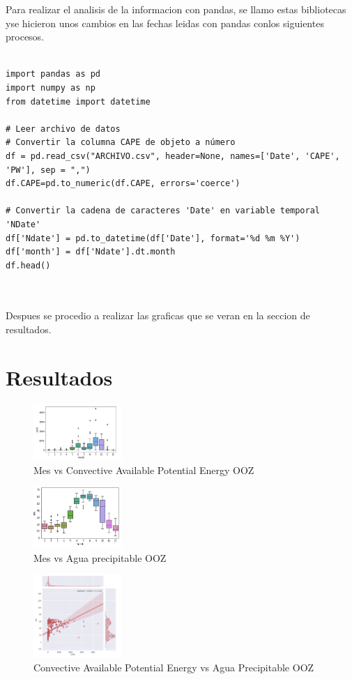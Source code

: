 \documentclass[a4paper]{article}
\begin{document}
Para realizar el analisis de la informacion con pandas, se llamo estas bibliotecas yse hicieron unos cambios en las fechas leidas con pandas conlos siguientes procesos. 

\begin{verbatim}

import pandas as pd
import numpy as np
from datetime import datetime

# Leer archivo de datos
# Convertir la columna CAPE de objeto a número
df = pd.read_csv("ARCHIVO.csv", header=None, names=['Date', 'CAPE', 'PW'], sep = ",")
df.CAPE=pd.to_numeric(df.CAPE, errors='coerce')

# Convertir la cadena de caracteres 'Date' en variable temporal 'NDate'
df['Ndate'] = pd.to_datetime(df['Date'], format='%d %m %Y')
df['month'] = df['Ndate'].dt.month
df.head()



\end{verbatim}

Despues se procedio a realizar las graficas que se veran en la seccion de resultados. 

\section{Resultados}



\begin{figure}[h]
\centering
\includegraphics[width=0.3\textwidth]{1.png}
\caption{\label{fig:}Mes vs Convective Available Potential Energy OOZ}
\end{figure}


\begin{figure}[h]
\centering
\includegraphics[width=0.3\textwidth]{2.png}
\caption{\label{fig:}Mes vs Agua precipitable OOZ}
\end{figure}

\begin{figure}[h]
\centering
\includegraphics[width=0.3\textwidth]{3.png}
\caption{\label{fig:}Convective Available Potential Energy vs Agua Precipitable OOZ}
\end{figure}
\end{document}
